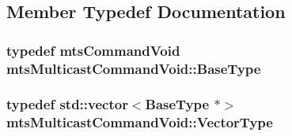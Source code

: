 \subsection{Member Typedef Documentation}
\hypertarget{classmts_multicast_command_void_a62fa2f55d19429b000f3cafc044b67a5}{
\subsubsection[{Base\-Type}]{\setlength{\rightskip}{0pt plus 5cm}typedef {\bf mts\-Command\-Void} {\bf mts\-Multicast\-Command\-Void\-::\-Base\-Type}}}\label{classmts_multicast_command_void_a62fa2f55d19429b000f3cafc044b67a5}
\hypertarget{classmts_multicast_command_void_a2d0478105f8fcc377056363ab5aa7fa0}{
\subsubsection[{Vector\-Type}]{\setlength{\rightskip}{0pt plus 5cm}typedef std\-::vector$<${\bf Base\-Type} $\ast$$>$ {\bf mts\-Multicast\-Command\-Void\-::\-Vector\-Type}}}\label{classmts_multicast_command_void_a2d0478105f8fcc377056363ab5aa7fa0}


